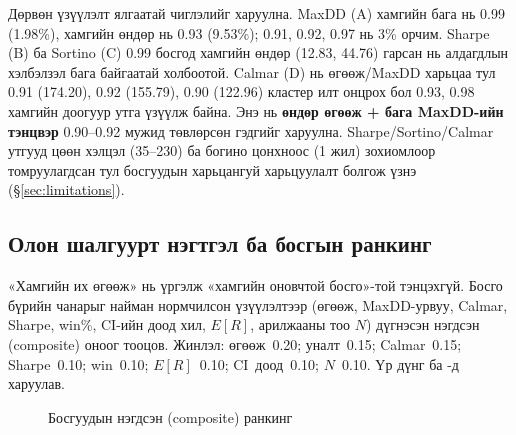 Дөрвөн үзүүлэлт ялгаатай чиглэлийг харуулна. MaxDD (A) хамгийн бага нь 0.99 (1.98\%), хамгийн өндөр нь 0.93 (9.53\%); 0.91, 0.92, 0.97 нь 3\% орчим. Sharpe (B) ба Sortino (C) 0.99 босгод хамгийн өндөр (12.83, 44.76) гарсан нь алдагдлын хэлбэлзэл бага байгаатай холбоотой. Calmar (D) нь өгөөж/MaxDD харьцаа тул 0.91 (174.20), 0.92 (155.79), 0.90 (122.96) кластер илт онцрох бол 0.93, 0.98 хамгийн доогуур утга үзүүлж байна. Энэ нь \textbf{өндөр өгөөж + бага MaxDD-ийн тэнцвэр} 0.90--0.92 мужид төвлөрсөн гэдгийг харуулна. Sharpe/Sortino/Calmar утгууд цөөн хэлцэл (35--230) ба богино цонхноос (1 жил) зохиомлоор томруулагдсан тул босгуудын харьцангуй харьцуулалт болгож үзнэ (§\ref{sec:limitations}).

\subsection{Олон шалгуурт нэгтгэл ба босгын ранкинг}
\label{subsec:composite_rank}

«Хамгийн их өгөөж» нь үргэлж «хамгийн оновчтой босго»-той тэнцэхгүй. Босго бүрийн чанарыг найман нормчилсон үзүүлэлтээр (өгөөж, MaxDD-урвуу, Calmar, Sharpe, win\%, CI-ийн доод хил, $E[R]$, арилжааны тоо $N$) дүгнэсэн нэгдсэн (composite) оноог тооцов. Жинлэл: өгөөж~0.20; уналт~0.15; Calmar~0.15; Sharpe~0.10; win~0.10; $E[R]$~0.10; CI~доод~0.10; $N$~0.10. Үр дүнг  ба -д харуулав.

\begin{figure}[H]
\centering
{}
\caption{Босгуудын нэгдсэн (composite) ранкинг}
\label{fig:composite_score}
\end{figure}

